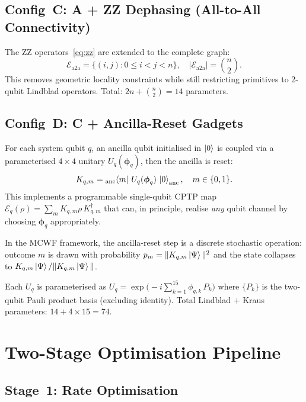 \documentclass[11pt,a4paper]{article}
\begin{document}
\subsection{Config~C: A + ZZ Dephasing (All-to-All Connectivity)}

The ZZ operators~\eqref{eq:zz} are extended to the complete graph:
\begin{equation}
\mathcal{E}_\text{a2a} = \{(i,j) : 0 \le i < j < n\},
\quad |\mathcal{E}_\text{a2a}| = \binom{n}{2}.
\end{equation}
This removes geometric locality constraints while still restricting
primitives to 2-qubit Lindblad operators.
Total: $2n + \binom{n}{2} = 14$ parameters.

\subsection{Config~D: C + Ancilla-Reset Gadgets}

For each system qubit $q$, an ancilla qubit initialised in $\ket{0}$
is coupled via a parameterised $4\times 4$ unitary
$U_q(\boldsymbol\phi_q)$, then the ancilla is reset:
\begin{equation}
K_{q,m} = {}_\text{anc}\!\bra{m}\, U_q(\boldsymbol\phi_q)\,
\ket{0}_\text{anc}, \quad m \in \{0,1\}.
\end{equation}
This implements a programmable single-qubit CPTP map
$\mathcal{E}_q(\rho) = \sum_m K_{q,m}\rho\, K_{q,m}^\dagger$ that
can, in principle, realise \emph{any} qubit channel by choosing
$\boldsymbol\phi_q$ appropriately.

In the MCWF framework, the ancilla-reset step is a discrete
stochastic operation: outcome $m$ is drawn with probability
$p_m = \|K_{q,m}\ket{\Psi}\|^2$ and the state collapses to
$K_{q,m}\ket{\Psi}/\|K_{q,m}\ket{\Psi}\|$.

Each $U_q$ is parameterised as
$U_q = \exp\!\bigl(-i\sum_{k=1}^{15}\phi_{q,k}\,P_k\bigr)$
where $\{P_k\}$ is the two-qubit Pauli product basis (excluding identity).
Total Lindblad + Kraus parameters: $14 + 4 \times 15 = 74$.

\section{Two-Stage Optimisation Pipeline}
\label{sec:fitting}

\subsection{Stage~1: Rate Optimisation}
\end{document}
